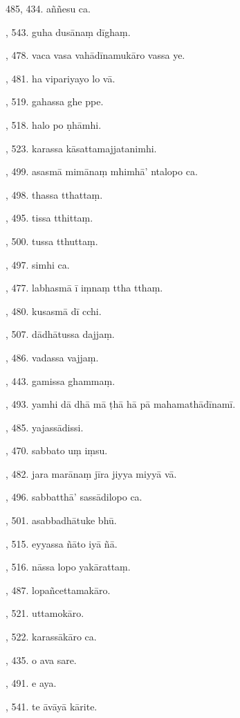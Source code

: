 485, 434. aññesu ca.\par {}, 543. guha dusānaṃ dīghaṃ.\par {}, 478. vaca vasa vahādīnamukāro vassa ye.\par {}, 481. ha vipariyayo lo vā.\par {}, 519. gahassa ghe ppe.\par {}, 518. halo po ṇhāmhi.\par {}, 523. karassa kāsattamajjatanimhi.\par {}, 499. asasmā mimānaṃ mhimhā’ ntalopo ca.\par {}, 498. thassa tthattaṃ.\par {}, 495. tissa tthittaṃ.\par {}, 500. tussa tthuttaṃ.\par {}, 497. simhi ca.\par {}, 477. labhasmā ī iṃnaṃ ttha tthaṃ.\par {}, 480. kusasmā dī cchi.\par {}, 507. dādhātussa dajjaṃ.\par {}, 486. vadassa vajjaṃ.\par {}, 443. gamissa ghammaṃ.\par {}, 493. yamhi dā dhā mā ṭhā hā pā mahamathādīnamī.\par {}, 485. yajassādissi.\par {}, 470. sabbato uṃ iṃsu.\par {}, 482. jara marānaṃ jīra jiyya miyyā vā.\par {}, 496. sabbatthā’ sassādilopo ca.\par {}, 501. asabbadhātuke bhū.\par {}, 515. eyyassa ñāto iyā ñā.\par {}, 516. nāssa lopo yakārattaṃ.\par {}, 487. lopañcettamakāro.\par {}, 521. uttamokāro.\par {}, 522. karassākāro ca.\par {}, 435. o ava sare.\par {}, 491. e aya.\par {}, 541. te āvāyā kārite.\par \noindent
